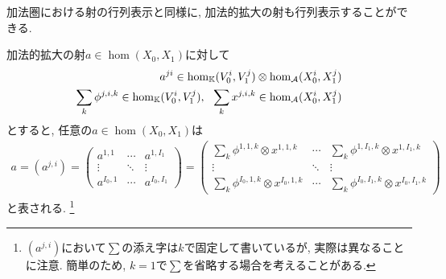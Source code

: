 \documentclass[aspectratio=169, dvipdfmx, 8pt, notheorems, uplatex]{beamer}
\begin{document}
\begin{frame}
  加法圏における射の行列表示と同様に, 加法的拡大の射も行列表示することができる. 

  \begin{notation}[加法的拡大の射の行列表示]
    加法的拡大の射$a \in \hom(X_0,X_1)$に対して
    \begin{align*}
      a^{ji} \in \hom_{\mathbb{K}}(V_0^i,V_1^j) \otimes \hom_{\mathcal{A}}(X_0^i,X_1^j) \\
      \sum_{k} \phi^{j,i,k} \in \hom_{\mathbb{K}}(V_0^i,V_1^j), ~~
      \sum_{k} x^{j,i,k} \in \hom_{\mathcal{A}}(X_0^i,X_1^j)
    \end{align*}
    とすると, 任意の$a \in \hom (X_0,X_1)$は
    \begin{align*}
      a = (a^{j,i}) 
      = \begin{pmatrix}
        a^{1,1} & \cdots & a^{1,I_1} \\
        \vdots & \ddots & \vdots \\
        a^{I_0,1} & \cdots & a^{I_0,I_1}
      \end{pmatrix}
      = \begin{pmatrix}
        \sum_{k} \phi^{1,1,k} \otimes x^{1,1,k} & \cdots & \sum_{k} \phi^{1,I_1,k} \otimes x^{1,I_1,k} \\
        \vdots & \ddots & \vdots \\
        \sum_{k} \phi^{I_0,1,k} \otimes x^{I_0,1,k} & \cdots & \sum_{k} \phi^{I_0,I_1,k} \otimes x^{I_0,I_1,k}
      \end{pmatrix}
    \end{align*}
    と表される. 
    \footnote{
      $(a^{j,i})$において$\sum$の添え字は$k$で固定して書いているが, 実際は異なることに注意.
      簡単のため, $k=1$で$\sum$を省略する場合を考えることがある. 
    }
  \end{notation}
\end{frame}
\end{document}
